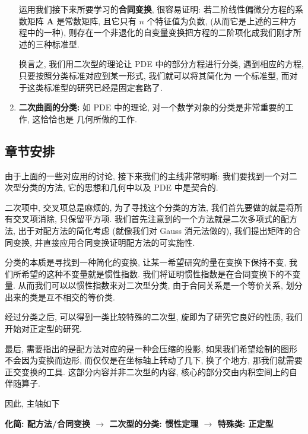 \documentclass[UTF8]{book}
\begin{document}
\begin{enumerate}
    运用我们接下来所要学习的\textbf{合同变换}, 很容易证明: 
    若二阶线性偏微分方程的系数矩阵 $\boldsymbol{A}$ 是常数矩阵, 
    且它只有 $n$ 个特征值为负数, (从而它是上述的三种方程中的一种), 
    则存在一个非退化的自变量变换把方程的二阶项化成我们刚才所述的三种标准型. 

    换言之, 我们用二次型的理论让 PDE 中的部分方程进行分类, 
    遇到相应的方程, 只要按照分类标准对应到某一形式, 我们就可以将其简化为
    一个标准型, 而对于这类标准型的研究已经是固定套路了. 

    \item \textbf{二次曲面的分类:} 
    如 PDE 中的理论, 对一个数学对象的分类是非常重要的工作, 这恰恰也是
    几何所做的工作.
\end{enumerate}



\subsection{章节安排}


由于上面的一些对应用的讨论, 接下来我们的主线非常明晰: 
我们要找到一个对二次型分类的方法, 它的思想和几何中以及 PDE 中是契合的. 

二次项中, 交叉项总是麻烦的, 为了寻找这个分类的方法, 
我们首先要做的就是将所有交叉项消除, 只保留平方项. 
我们首先注意到的一个方法就是二次多项式的配方法, 
出于对配方法的简化考虑 (就像我们对 Gauss 消元法做的), 
我们提出矩阵的合同变换, 并直接应用合同变换证明配方法的可实施性. 

分类的本质是寻找到一种简化的变换, 让某一希望研究的量在变换下保持不变, 
我们所希望的这种不变量就是惯性指数. 我们将证明惯性指数是在合同变换下的不变量. 
从而我们可以以惯性指数来对二次型分类, 由于合同关系是一个等价关系, 
划分出来的类是互不相交的等价类. 

经过分类之后, 可以得到一类比较特殊的二次型, 旋即为了研究它良好的性质, 
我们开始对正定型的研究. 

最后, 需要指出的是配方法对应的是一种会压缩的投影, 如果我们希望绘制的图形
不会因为变换而边形, 而仅仅是在坐标轴上转动了几下, 换了个地方, 
那我们就需要正交变换的工具. 这部分内容并非二次型的内容, 
核心的部分交由内积空间上的自伴随算子. 

因此, 主轴如下
\begin{center}
    \textbf{
    化简: 配方法/合同变换 $\longrightarrow$ 二次型的分类: 惯性定理 
    $\longrightarrow$ 特殊类: 正定型}
\end{center}
\end{document}
